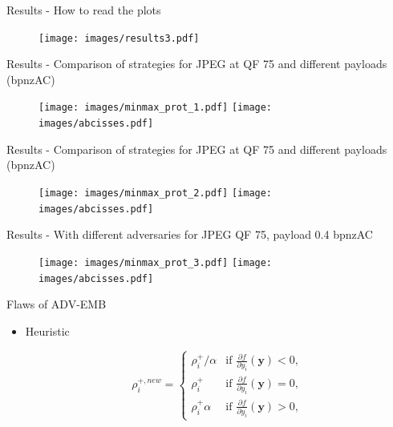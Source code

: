 \documentclass[10pt]{beamer}
\begin{document}







\begin{frame}{Results - How to read the plots }
    \begin{figure}
        \texttt{[image: images/results3.pdf]}
    \end{figure}
\end{frame}


\begin{frame}{Results - Comparison of strategies for JPEG at QF 75 and different payloads (bpnzAC)}
    \begin{figure}
        \texttt{[image: images/minmax\_prot\_1.pdf]}
        \texttt{[image: images/abcisses.pdf]}
    \end{figure}
\end{frame}

\begin{frame}{Results - Comparison of strategies for JPEG at QF 75 and different payloads (bpnzAC)}
    \begin{figure}
        \texttt{[image: images/minmax\_prot\_2.pdf]}
        \texttt{[image: images/abcisses.pdf]}
    \end{figure}
\end{frame}

\begin{frame}{Results - With different adversaries for JPEG QF 75, payload 0.4 bpnzAC}
    \begin{figure}
        \texttt{[image: images/minmax\_prot\_3.pdf]}
        \texttt{[image: images/abcisses.pdf]}
    \end{figure}
\end{frame}


\begin{frame}{Flaws of ADV-EMB}

    \begin{itemize}

        \item Heuristic
        
            \begin{equation}
                \rho_{i}^{+, new} = 
                \left\{
                    \begin{array}{ll}
                        \rho_{i}^+/\alpha & \mbox{if } \frac{\partial f}{\partial y_{i}}\left(\mathbf{y}\right) < 0, \\
                        \rho_{i}^+ & \mbox{if } \frac{\partial f}{\partial y_{i}}\left(\mathbf{y}\right) = 0, \\
                        \rho_{i}^+ \alpha & \mbox{if } \frac{\partial f}{\partial y_{i}}\left(\mathbf{y}\right) > 0,
                    \end{array}
                \right.
            \end{equation}

    \end{itemize}

\end{frame}
\end{document}
